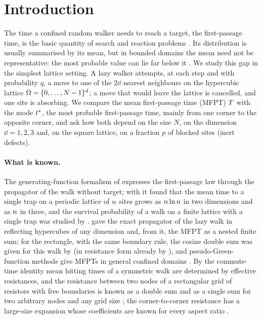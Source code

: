 \section{Introduction}\label{s1_intro:sec}

The time a confined random walker needs to reach a target, the first-passage time, is the basic quantity of
search and reaction problems \citep{Redner2001,BenichouVoituriez2014}. Its distribution is usually summarised by
its mean, but in bounded domains the mean need not be representative: the most probable value can lie far below
it \citep{Mattos2012,GodecMetzler2016,Grebenkov2018}. We study this gap in the simplest lattice setting. A lazy
walker attempts, at each step and with probability $q$, a move to one of the $2\dd$ nearest neighbours on the
hypercubic lattice $\Omega=\{0,\dots,N-1\}^{d}$; a move that would leave the lattice is cancelled, and one site is
absorbing. We compare the mean first-passage time (MFPT) $T$ with the mode $t^{*}$, the most probable
first-passage time, mainly from one corner to the opposite corner, and ask how both depend on the size $N$, on
the dimension $\dd=1,2,3$ and, on the square lattice, on a fraction $p$ of blocked sites (inert defects).

\paragraph{What is known.}
The generating-function formalism of \citet{MontrollWeiss1965} expresses the first-passage law through the
propagator of the walk without target; with it \citet{Montroll1969} found that the mean time to a single trap on
a periodic lattice of $n$ sites grows as $n\ln n$ in two dimensions and as $n$ in three, and the survival
probability of a walk on a finite lattice with a single trap was studied by \citet{WeissHavlinBunde1985}.
\citet{Giuggioli2020} gave the exact propagator of the lazy walk in reflecting hypercubes of any dimension and,
from it, the MFPT as a nested finite sum; for the rectangle, with the same boundary rule, the cosine double sum was
given for this walk by \citet{CondaminBenichou2006} (in resistance form already by \citet{Wu2004}), and pseudo-Green-function methods give MFPTs in general confined domains
\citep{Condamin2005,Condamin2007PRE,Condamin2007Nature}. By the commute-time identity
\citep{Chandra1989,Tetali1991} mean hitting times of a symmetric walk are determined by effective resistances, and
the resistance between two nodes of a rectangular grid of resistors with free boundaries is known as a double sum
\citep{Wu2004} and as a single sum for two arbitrary nodes and any grid size \citep{TanTan2020}; the
corner-to-corner resistance has a large-size expansion \citep{EssamWu2009} whose coefficients are known for every
aspect ratio \citep{IzmailianHuang2010}.

